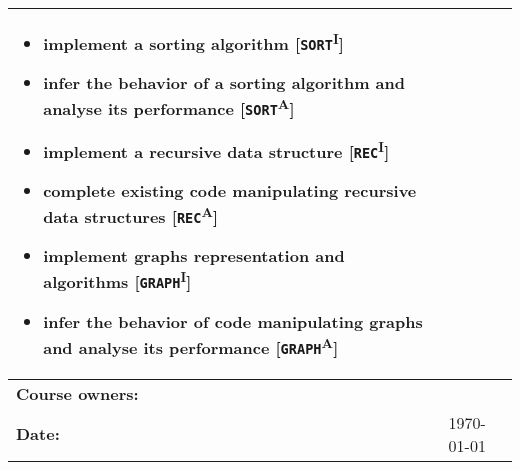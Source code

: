 \begin{tabularx}{\textwidth}{|>{\columncolor{lichtGrijs}} p{}|X|}
\begin{itemize}
				\item implement a sorting algorithm [\texttt{SORT}\textsuperscript{I}]
				\item infer the behavior of a sorting algorithm and analyse its performance [\texttt{SORT}\textsuperscript{A}]
				\item implement a recursive data structure [\texttt{REC}\textsuperscript{I}] 
				\item complete existing code manipulating recursive data structures [\texttt{REC}\textsuperscript{A}]
				\item implement graphs representation and algorithms [\texttt{GRAPH}\textsuperscript{I}]
				\item infer the behavior of code manipulating graphs and analyse its performance [\texttt{GRAPH}\textsuperscript{A}]
			\end{itemize} \\
	\hline

	\textbf{Course owners:} & \author\\
	\hline
	\textbf{Date:} & \today \\
	\hline
\end{tabularx}
\newpage
